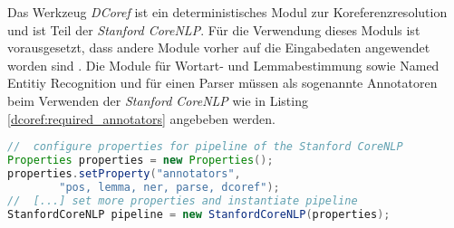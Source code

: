 Das Werkzeug \emph{DCoref} ist ein deterministisches Modul zur Koreferenzresolution und ist Teil der \emph{Stanford CoreNLP}. Für die Verwendung dieses Moduls ist vorausgesetzt, dass andere Module vorher auf die Eingabedaten angewendet worden sind \autocite[]{chris_stanford_dcoref}. Die Module für Wortart- und Lemmabestimmung sowie Named Entitiy Recognition und für einen Parser müssen als sogenannte Annotatoren beim Verwenden der \emph{Stanford CoreNLP} wie in Listing \ref{dcoref:required_annotators} angebeben werden.

\begin{lstlisting}[label=dcoref:required_annotators, language=Java, caption=Angabe vorausgesetzter Annotatoren in Java]
//	configure properties for pipeline of the Stanford CoreNLP
Properties properties = new Properties();
properties.setProperty("annotators", 
		"pos, lemma, ner, parse, dcoref");
//	[...] set more properties and instantiate pipeline
StanfordCoreNLP pipeline = new StanfordCoreNLP(properties);
\end{lstlisting}

